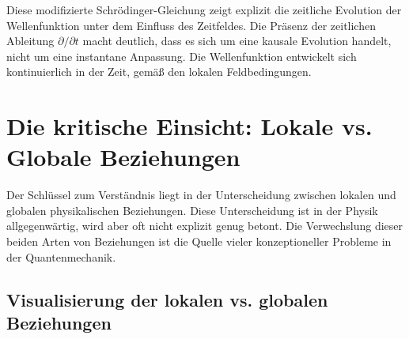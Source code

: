 	Diese modifizierte Schrödinger-Gleichung zeigt explizit die zeitliche Evolution der Wellenfunktion unter dem Einfluss des Zeitfeldes. Die Präsenz der zeitlichen Ableitung $\partial/\partial t$ macht deutlich, dass es sich um eine kausale Evolution handelt, nicht um eine instantane Anpassung. Die Wellenfunktion entwickelt sich kontinuierlich in der Zeit, gemäß den lokalen Feldbedingungen.
	
	\section{Die kritische Einsicht: Lokale vs. Globale Beziehungen}
	
	Der Schlüssel zum Verständnis liegt in der Unterscheidung zwischen lokalen und globalen physikalischen Beziehungen. Diese Unterscheidung ist in der Physik allgegenwärtig, wird aber oft nicht explizit genug betont. Die Verwechslung dieser beiden Arten von Beziehungen ist die Quelle vieler konzeptioneller Probleme in der Quantenmechanik.
	\subsection{Visualisierung der lokalen vs. globalen Beziehungen}
	
